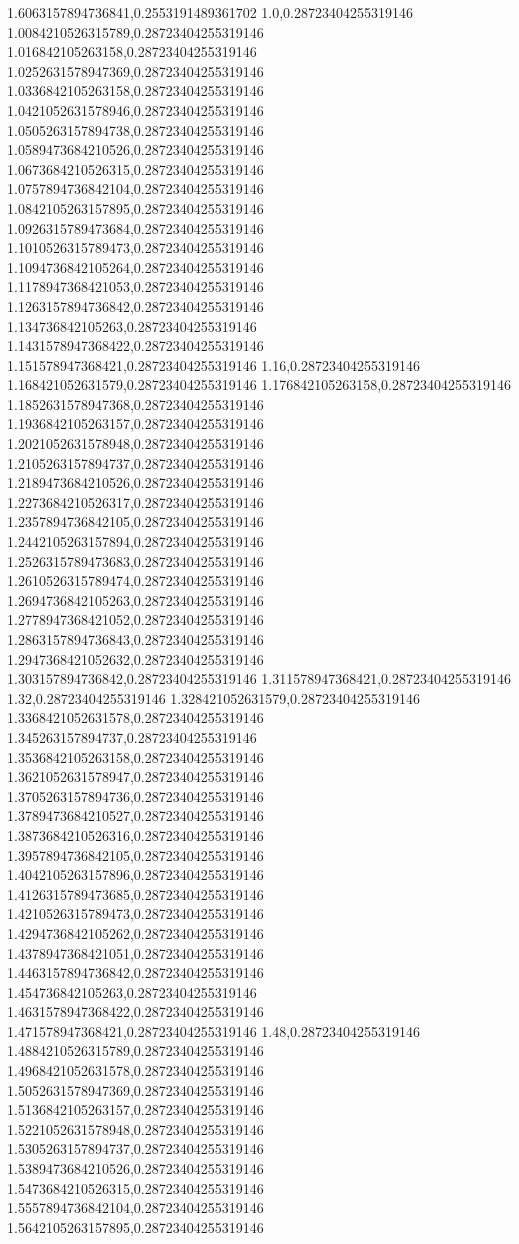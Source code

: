 1.6063157894736841,0.2553191489361702
1.0,0.28723404255319146
1.0084210526315789,0.28723404255319146
1.016842105263158,0.28723404255319146
1.0252631578947369,0.28723404255319146
1.0336842105263158,0.28723404255319146
1.0421052631578946,0.28723404255319146
1.0505263157894738,0.28723404255319146
1.0589473684210526,0.28723404255319146
1.0673684210526315,0.28723404255319146
1.0757894736842104,0.28723404255319146
1.0842105263157895,0.28723404255319146
1.0926315789473684,0.28723404255319146
1.1010526315789473,0.28723404255319146
1.1094736842105264,0.28723404255319146
1.1178947368421053,0.28723404255319146
1.1263157894736842,0.28723404255319146
1.134736842105263,0.28723404255319146
1.1431578947368422,0.28723404255319146
1.151578947368421,0.28723404255319146
1.16,0.28723404255319146
1.168421052631579,0.28723404255319146
1.176842105263158,0.28723404255319146
1.1852631578947368,0.28723404255319146
1.1936842105263157,0.28723404255319146
1.2021052631578948,0.28723404255319146
1.2105263157894737,0.28723404255319146
1.2189473684210526,0.28723404255319146
1.2273684210526317,0.28723404255319146
1.2357894736842105,0.28723404255319146
1.2442105263157894,0.28723404255319146
1.2526315789473683,0.28723404255319146
1.2610526315789474,0.28723404255319146
1.2694736842105263,0.28723404255319146
1.2778947368421052,0.28723404255319146
1.2863157894736843,0.28723404255319146
1.2947368421052632,0.28723404255319146
1.303157894736842,0.28723404255319146
1.311578947368421,0.28723404255319146
1.32,0.28723404255319146
1.328421052631579,0.28723404255319146
1.3368421052631578,0.28723404255319146
1.345263157894737,0.28723404255319146
1.3536842105263158,0.28723404255319146
1.3621052631578947,0.28723404255319146
1.3705263157894736,0.28723404255319146
1.3789473684210527,0.28723404255319146
1.3873684210526316,0.28723404255319146
1.3957894736842105,0.28723404255319146
1.4042105263157896,0.28723404255319146
1.4126315789473685,0.28723404255319146
1.4210526315789473,0.28723404255319146
1.4294736842105262,0.28723404255319146
1.4378947368421051,0.28723404255319146
1.4463157894736842,0.28723404255319146
1.454736842105263,0.28723404255319146
1.4631578947368422,0.28723404255319146
1.471578947368421,0.28723404255319146
1.48,0.28723404255319146
1.4884210526315789,0.28723404255319146
1.4968421052631578,0.28723404255319146
1.5052631578947369,0.28723404255319146
1.5136842105263157,0.28723404255319146
1.5221052631578948,0.28723404255319146
1.5305263157894737,0.28723404255319146
1.5389473684210526,0.28723404255319146
1.5473684210526315,0.28723404255319146
1.5557894736842104,0.28723404255319146
1.5642105263157895,0.28723404255319146
